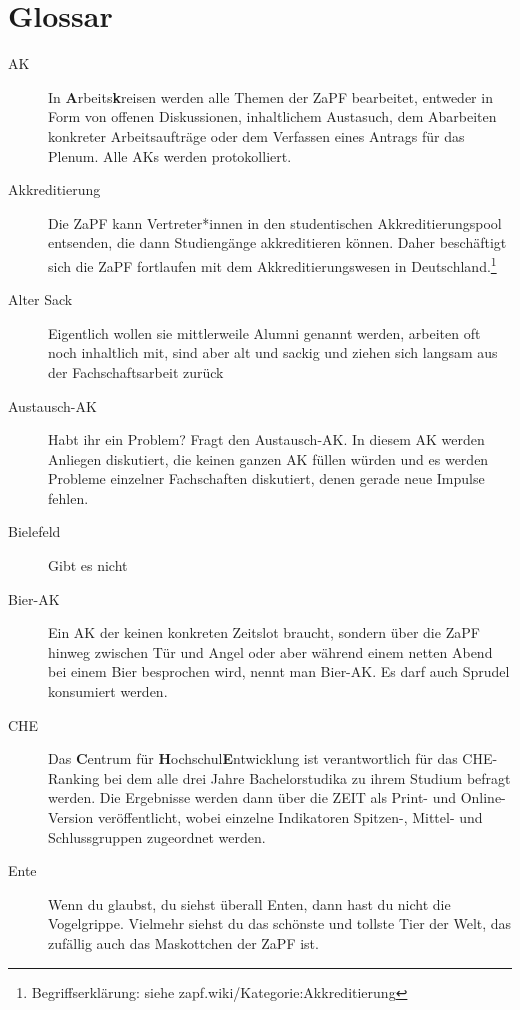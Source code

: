 
\newcommand*{\fett}[1]{\textbf{#1}}

\chapter{Glossar}

\begin{description}
	\item[AK] In \fett{A}rbeits\fett{k}reisen werden alle Themen der ZaPF bearbeitet, entweder in Form von offenen Diskussionen, inhaltlichem Austasuch, dem Abarbeiten konkreter Arbeitsaufträge oder dem Verfassen eines Antrags für das Plenum. Alle AKs werden protokolliert.
	\item[Akkreditierung] Die ZaPF kann Vertreter*innen in den studentischen Akkreditierungspool entsenden, die dann Studiengänge akkreditieren können. Daher beschäftigt sich die ZaPF fortlaufen mit dem Akkreditierungswesen in Deutschland.\footnote{Begriffserklärung: siehe zapf.wiki/Kategorie:Akkreditierung}
	\item[Alter Sack] Eigentlich wollen sie mittlerweile Alumni genannt werden, arbeiten oft noch inhaltlich mit, sind aber alt und sackig und ziehen sich langsam aus der Fachschaftsarbeit zurück
	\item[Austausch-AK] Habt ihr ein Problem? Fragt den Austausch-AK. In diesem AK werden Anliegen diskutiert, die keinen ganzen AK füllen würden und es werden Probleme einzelner Fachschaften diskutiert, denen gerade neue Impulse fehlen.
	\item[Bielefeld] Gibt es nicht
	\item[Bier-AK] Ein AK der keinen konkreten Zeitslot braucht, sondern über die ZaPF hinweg zwischen Tür und Angel oder aber während einem netten Abend bei einem Bier besprochen wird, nennt man Bier-AK. Es darf auch Sprudel konsumiert werden. 
	\item[CHE] Das \fett{C}entrum für \fett{H}ochschul\fett{E}ntwicklung ist verantwortlich für das CHE-Ranking bei dem alle drei Jahre Bachelorstudika zu ihrem Studium befragt werden. Die Ergebnisse werden dann über die ZEIT als Print- und Online-Version veröffentlicht, wobei einzelne Indikatoren Spitzen-, Mittel- und Schlussgruppen zugeordnet werden.
	\item[Ente] Wenn du glaubst, du siehst überall Enten, dann hast du nicht die Vogelgrippe. Vielmehr siehst du das schönste und tollste Tier der Welt, das zufällig auch das Maskottchen der ZaPF ist.

\end{description}
